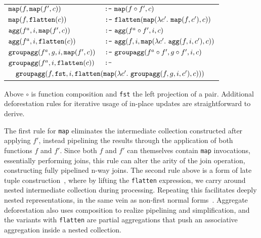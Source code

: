 \vspace{1mm}\hspace{-6mm}
\begin{tabular}{p{3.6cm}l}
$\mbox{\texttt{map}}(f, \mbox{\texttt{map}}(f', c))$ 
    & $\mbox{\texttt{:-}}\ \mbox{\texttt{map}}(f \circ f', c)$
\\
$\mbox{\texttt{map}}(f, \mbox{\texttt{flatten}}(c))$
    & $\xform\ \flatten(\map(\lambda c'.\ \map(f,c'), c))$
\\
$\mbox{\texttt{agg}}(f^a, i, \mbox{\texttt{map}}(f', c))$
    & $\xform\ \agg(f^a \circ f', i, c)$
\\
$\mbox{\texttt{agg}}(f^a, i, \mbox{\texttt{flatten}}(c))$
    & $\mbox{\texttt{:-}}\ \mbox{\texttt{agg}}(f, i, \mbox{\texttt{map}}(\lambda c'.\ \mbox{\texttt{agg}}(f, i, c'),c))$
\\
$\mbox{\texttt{groupagg}}(f^a, g, i, \mbox{\texttt{map}}(f', c))$
    & $\xform\ \groupagg(f^a \circ f', g \circ f', i, c)$
\\
$\mbox{\texttt{groupagg}}(f^a, i, \mbox{\texttt{flatten}}(c))$ & $\mbox{\texttt{:-}}$
\\
\multicolumn{2}{l}{
$\quad\mbox{\texttt{groupagg}}(f, \mbox{\texttt{fst}}, i, \mbox{\texttt{flatten}}(
    \mbox{\texttt{map}}(\lambda c'.\ \mbox{\texttt{groupagg}}(f, g, i, c'),c)))$}
\end{tabular}


\vspace{1mm}
Above $\circ$ is function composition and \texttt{fst} the left projection of a
pair.
Additional deforestation rules for iterative usage of in-place updates are
straightforward to derive.

The first rule for \texttt{map} eliminates the intermediate collection
constructed after applying $f'$, instead pipelining the results through the
application of both functions $f$ and $f'$. Since both $f$ and $f'$ can
themselves contain \texttt{map} invocations, essentially performing joins, this
rule can alter the arity of the join operation, constructing fully pipelined
n-way joins. The second rule above is a form of late tuple
construction~\cite{abadi-icde:07}, where by lifting the \texttt{flatten}
expression, we carry around nested intermediate collection during processing.
Repeating this facilitates deeply nested representations, in the same vein as
non-first normal forms~\cite{schek-infsys:86}. Aggregate deforestation also uses
composition to realize pipelining and simplification, and the variants with
\texttt{flatten} are partial aggregations that push an associative aggregation
inside a nested collection.



